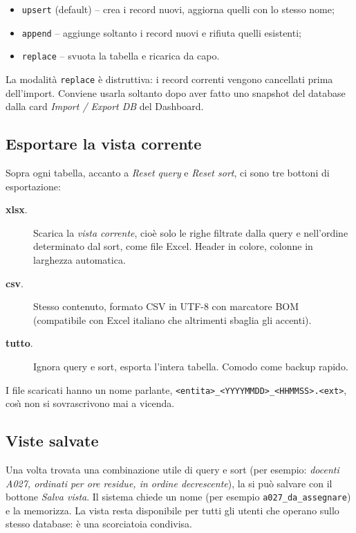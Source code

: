 \begin{itemize}
\item \texttt{upsert} (default) -- crea i record nuovi,
  aggiorna quelli con lo stesso nome;
\item \texttt{append} -- aggiunge soltanto i record nuovi e
  rifiuta quelli esistenti;
\item \texttt{replace} -- svuota la tabella e ricarica da capo.
\end{itemize}

\begin{avvertenzabox}
La modalit\`a \texttt{replace} \`e distruttiva: i record correnti
vengono cancellati prima dell'import. Conviene usarla soltanto
dopo aver fatto uno snapshot del database dalla card
\emph{Import / Export DB} del Dashboard.
\end{avvertenzabox}

\subsection{Esportare la vista corrente}

Sopra ogni tabella, accanto a \emph{Reset query} e \emph{Reset
sort}, ci sono tre bottoni di esportazione:

\begin{description}
\item[\textbf{xlsx}.] Scarica la \emph{vista corrente}, cio\`e
  solo le righe filtrate dalla query e nell'ordine determinato
  dal sort, come file Excel. Header in colore, colonne in
  larghezza automatica.
\item[\textbf{csv}.] Stesso contenuto, formato CSV in UTF-8 con
  marcatore BOM (compatibile con Excel italiano che altrimenti
  sbaglia gli accenti).
\item[\textbf{tutto}.] Ignora query e sort, esporta l'intera
  tabella. Comodo come backup rapido.
\end{description}

I file scaricati hanno un nome parlante,
\texttt{<entita>\_<YYYYMMDD>\_<HHMMSS>.<ext>}, cos\`{\i} non si
sovrascrivono mai a vicenda.

\subsection{Viste salvate}

Una volta trovata una combinazione utile di query e sort (per
esempio: \emph{docenti A027, ordinati per ore residue, in
ordine decrescente}), la si pu\`o salvare con il bottone
\emph{Salva vista}. Il sistema chiede un nome (per esempio
\texttt{a027\_da\_assegnare}) e la memorizza. La vista resta
disponibile per tutti gli utenti che operano sullo stesso
database: \`e una scorciatoia condivisa.

